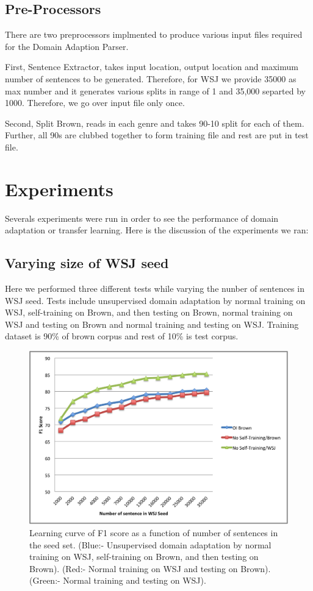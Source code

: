 \subsection {Pre-Processors}

There are two preprocessors implmented to produce various input files required for the Domain Adaption Parser. 

First, Sentence Extractor, takes input location, output location and maximum number of sentences to be generated. Therefore, for WSJ we provide 35000 as max number and it generates various splits in range of 1 and 35,000 separted by 1000. Therefore, we go over input file only once.

Second, Split Brown, reads in each genre and takes 90-10 split for each of them. Further, all 90s are clubbed together to form training file and rest are put in test file. 

\section {Experiments}

Severals experiments were run in order to see the performance of domain adaptation or transfer learning.
Here is the discussion of the experiments we ran:

\subsection {Varying size of WSJ seed}

Here we performed three different tests while varying the nunber of sentences in WSJ seed. Tests include unsupervised domain adaptation by normal training on WSJ, self-training on Brown, and then testing on Brown, normal training on WSJ and testing on Brown and normal training and testing on WSJ. Training dataset is 90\% of brown corpus and rest of 10\% is test corpus.

\begin{figure}[ht!]
\centering
\includegraphics[width=140mm]{exp1.png}
\caption{Learning curve of F1 score as a function of number of sentences in the seed set. (Blue:- Unsupervised domain adaptation by normal training on WSJ, self-training on Brown, and then testing on Brown). (Red:- Normal training on WSJ and testing on Brown). (Green:- Normal training and testing on WSJ).}
\label{accuracy}
\end{figure}

